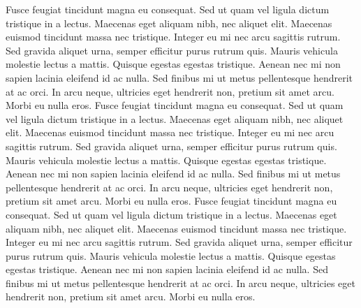 Fusce feugiat tincidunt magna eu consequat. Sed ut quam vel ligula dictum tristique in a lectus. Maecenas eget aliquam nibh, nec aliquet elit. Maecenas euismod tincidunt massa nec tristique. Integer eu mi nec arcu sagittis rutrum. Sed gravida aliquet urna, semper efficitur purus rutrum quis. Mauris vehicula molestie lectus a mattis. Quisque egestas egestas tristique. Aenean nec mi non sapien lacinia eleifend id ac nulla. Sed finibus mi ut metus pellentesque hendrerit at ac orci. In arcu neque, ultricies eget hendrerit non, pretium sit amet arcu. Morbi eu nulla eros.
Fusce feugiat tincidunt magna eu consequat. Sed ut quam vel ligula dictum tristique in a lectus. Maecenas eget aliquam nibh, nec aliquet elit. Maecenas euismod tincidunt massa nec tristique. Integer eu mi nec arcu sagittis rutrum. Sed gravida aliquet urna, semper efficitur purus rutrum quis. Mauris vehicula molestie lectus a mattis. Quisque egestas egestas tristique. Aenean nec mi non sapien lacinia eleifend id ac nulla. Sed finibus mi ut metus pellentesque hendrerit at ac orci. In arcu neque, ultricies eget hendrerit non, pretium sit amet arcu. Morbi eu nulla eros.
Fusce feugiat tincidunt magna eu consequat. Sed ut quam vel ligula dictum tristique in a lectus. Maecenas eget aliquam nibh, nec aliquet elit. Maecenas euismod tincidunt massa nec tristique. Integer eu mi nec arcu sagittis rutrum. Sed gravida aliquet urna, semper efficitur purus rutrum quis. Mauris vehicula molestie lectus a mattis. Quisque egestas egestas tristique. Aenean nec mi non sapien lacinia eleifend id ac nulla. Sed finibus mi ut metus pellentesque hendrerit at ac orci. In arcu neque, ultricies eget hendrerit non, pretium sit amet arcu. Morbi eu nulla eros.

